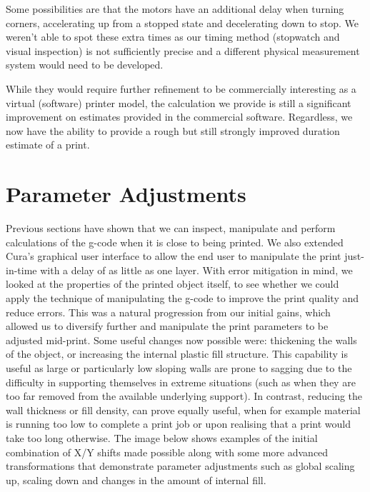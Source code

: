 \documentclass[pdftex, 11pt]{report} %
\begin{document}
Some possibilities are that the motors have an additional delay when turning corners, accelerating up from a stopped state and decelerating down to stop. We weren't able to spot these extra times as our timing method (stopwatch and visual inspection) is not sufficiently precise and a different physical measurement system would need to be developed.

While they would require further refinement to be commercially interesting as a virtual (software) printer model, the calculation we provide is still a significant improvement on estimates provided in the commercial software. Regardless, we now have the ability to provide a rough but still strongly improved duration estimate of a print.





\section{Parameter Adjustments}
\label{section:ParameterAdjustments}
Previous sections have shown that we can inspect, manipulate and perform calculations of the g-code when it is close to being printed. We also extended Cura's graphical user interface to allow the end user to manipulate the print just-in-time with a delay of as little as one layer.
	With error mitigation in mind, we looked at the properties of the printed object itself, to see whether we could apply the technique of manipulating the g-code to improve the print quality and reduce errors. This was a natural progression from our initial gains, which allowed us to diversify further and manipulate the print parameters to be adjusted mid-print.
Some useful changes now possible were: thickening the walls of the object, or increasing the internal plastic fill structure. This capability is useful as large or particularly low sloping walls are prone to sagging due to the difficulty in supporting themselves in extreme situations (such as when they are too far removed from the available underlying support). In contrast, reducing the wall thickness or fill density, can prove equally useful, when for example material is running too low to complete a print job or upon realising that a print would take too long otherwise.
The image below shows examples of the initial combination of X/Y shifts made possible along with some more advanced transformations that demonstrate parameter adjustments such as global scaling up, scaling down and changes in the amount of internal fill.
\end{document}
